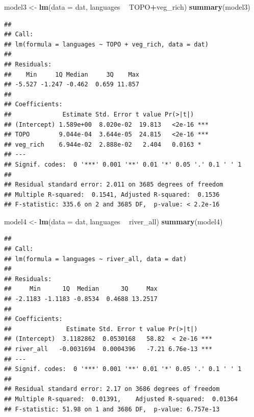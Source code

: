 \documentclass[12pt,]{article}
\newenvironment{Shaded}{\begin{snugshade}}{\end{snugshade}}
\newcommand{\KeywordTok}[1]{\textcolor[rgb]{0.13,0.29,0.53}{\textbf{#1}}}
\newcommand{\DataTypeTok}[1]{\textcolor[rgb]{0.13,0.29,0.53}{#1}}
\newcommand{\StringTok}[1]{\textcolor[rgb]{0.31,0.60,0.02}{#1}}
\newcommand{\OperatorTok}[1]{\textcolor[rgb]{0.81,0.36,0.00}{\textbf{#1}}}
\newcommand{\NormalTok}[1]{#1}
\begin{document}
\begin{Shaded}
\begin{Highlighting}[]
\NormalTok{model3 <-}\StringTok{ }\KeywordTok{lm}\NormalTok{(}\DataTypeTok{data =}\NormalTok{ dat, languages }\OperatorTok{~}\StringTok{ }\NormalTok{TOPO}\OperatorTok{+}\NormalTok{veg_rich)}
\KeywordTok{summary}\NormalTok{(model3)}
\end{Highlighting}
\end{Shaded}

\begin{verbatim}
## 
## Call:
## lm(formula = languages ~ TOPO + veg_rich, data = dat)
## 
## Residuals:
##    Min     1Q Median     3Q    Max 
## -5.527 -1.247 -0.462  0.659 11.857 
## 
## Coefficients:
##              Estimate Std. Error t value Pr(>|t|)    
## (Intercept) 1.589e+00  8.020e-02  19.813   <2e-16 ***
## TOPO        9.044e-04  3.644e-05  24.815   <2e-16 ***
## veg_rich    6.944e-02  2.888e-02   2.404   0.0163 *  
## ---
## Signif. codes:  0 '***' 0.001 '**' 0.01 '*' 0.05 '.' 0.1 ' ' 1
## 
## Residual standard error: 2.011 on 3685 degrees of freedom
## Multiple R-squared:  0.1541, Adjusted R-squared:  0.1536 
## F-statistic: 335.6 on 2 and 3685 DF,  p-value: < 2.2e-16
\end{verbatim}

\begin{Shaded}
\begin{Highlighting}[]
\NormalTok{model4 <-}\StringTok{ }\KeywordTok{lm}\NormalTok{(}\DataTypeTok{data =}\NormalTok{ dat, languages }\OperatorTok{~}\StringTok{ }\NormalTok{river_all)}
\KeywordTok{summary}\NormalTok{(model4)}
\end{Highlighting}
\end{Shaded}

\begin{verbatim}
## 
## Call:
## lm(formula = languages ~ river_all, data = dat)
## 
## Residuals:
##     Min      1Q  Median      3Q     Max 
## -2.1183 -1.1183 -0.8534  0.4688 13.2517 
## 
## Coefficients:
##               Estimate Std. Error t value Pr(>|t|)    
## (Intercept)  3.1182862  0.0530168   58.82  < 2e-16 ***
## river_all   -0.0031694  0.0004396   -7.21 6.76e-13 ***
## ---
## Signif. codes:  0 '***' 0.001 '**' 0.01 '*' 0.05 '.' 0.1 ' ' 1
## 
## Residual standard error: 2.17 on 3686 degrees of freedom
## Multiple R-squared:  0.01391,    Adjusted R-squared:  0.01364 
## F-statistic: 51.98 on 1 and 3686 DF,  p-value: 6.757e-13
\end{verbatim}
\end{document}

